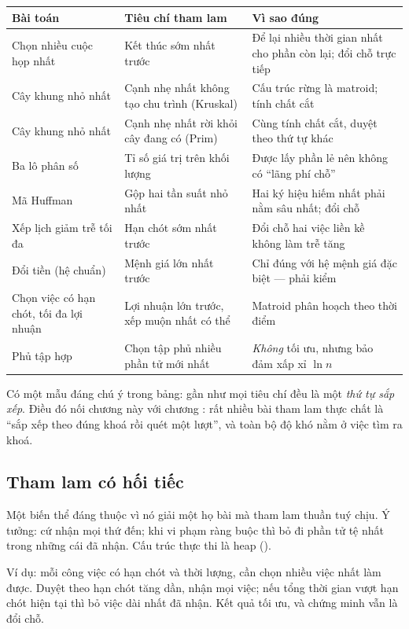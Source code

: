 \documentclass[../../algorithm.tex]{subfiles}
\begin{document}
\begin{center}\footnotesize
\begin{tabularx}{\linewidth}{@{}L{3.6cm}L{4.0cm}Y@{}}
\toprule
\textbf{Bài toán} & \textbf{Tiêu chí tham lam} & \textbf{Vì sao đúng}\\
\midrule
Chọn nhiều cuộc họp nhất & Kết thúc sớm nhất trước & Để lại nhiều thời gian nhất cho phần còn lại; đổi chỗ trực tiếp\\
Cây khung nhỏ nhất & Cạnh nhẹ nhất không tạo chu trình (Kruskal) & Cấu trúc rừng là matroid; tính chất cắt\\
Cây khung nhỏ nhất & Cạnh nhẹ nhất rời khỏi cây đang có (Prim) & Cùng tính chất cắt, duyệt theo thứ tự khác\\
Ba lô phân số & Tỉ số giá trị trên khối lượng & Được lấy phần lẻ nên không có ``lãng phí chỗ''\\
Mã Huffman & Gộp hai tần suất nhỏ nhất & Hai ký hiệu hiếm nhất phải nằm sâu nhất; đổi chỗ\\
Xếp lịch giảm trễ tối đa & Hạn chót sớm nhất trước & Đổi chỗ hai việc liền kề không làm trễ tăng\\
Đổi tiền (hệ chuẩn) & Mệnh giá lớn nhất trước & Chỉ đúng với hệ mệnh giá đặc biệt --- phải kiểm\\
Chọn việc có hạn chót, tối đa lợi nhuận & Lợi nhuận lớn trước, xếp muộn nhất có thể & Matroid phân hoạch theo thời điểm\\
Phủ tập hợp & Chọn tập phủ nhiều phần tử mới nhất & \emph{Không} tối ưu, nhưng bảo đảm xấp xỉ \(\ln n\)\\
\bottomrule
\end{tabularx}
\end{center}

Có một mẫu đáng chú ý trong bảng: gần như mọi tiêu chí đều là một \emph{thứ tự sắp xếp}. Điều đó nối chương này với chương : rất nhiều bài tham lam thực chất là ``sắp xếp theo đúng khoá rồi quét một lượt'', và toàn bộ độ khó nằm ở việc tìm ra khoá.

\subsection{Tham lam có hối tiếc}

Một biến thể đáng thuộc vì nó giải một họ bài mà tham lam thuần tuý chịu. Ý tưởng: cứ nhận mọi thứ đến; khi vi phạm ràng buộc thì bỏ đi phần tử tệ nhất trong những cái đã nhận. Cấu trúc thực thi là heap ().

Ví dụ: mỗi công việc có hạn chót và thời lượng, cần chọn nhiều việc nhất làm được. Duyệt theo hạn chót tăng dần, nhận mọi việc; nếu tổng thời gian vượt hạn chót hiện tại thì bỏ việc dài nhất đã nhận. Kết quả tối ưu, và chứng minh vẫn là đổi chỗ.
\end{document}
